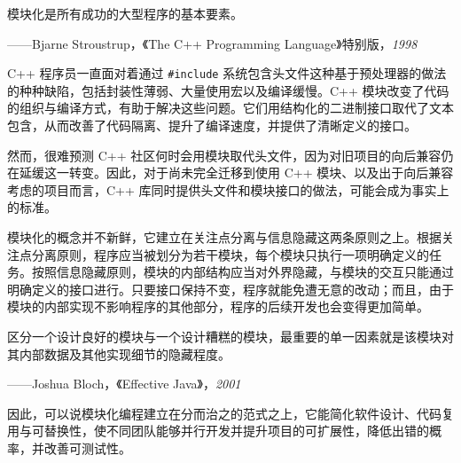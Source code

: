 \begin{myQuote}
模块化是所有成功的大型程序的基本要素。

——Bjarne Stroustrup，《The C++ Programming Language》特别版，\emph{1998}

\end{myQuote}

C++ 程序员一直面对着通过 \texttt{\#include} 系统包含头文件这种基于预处理器的做法的种种缺陷，包括封装性薄弱、大量使用宏以及编译缓慢。C++ 模块改变了代码的组织与编译方式，有助于解决这些问题。它们用结构化的二进制接口取代了文本包含，从而改善了代码隔离、提升了编译速度，并提供了清晰定义的接口。

然而，很难预测 C++ 社区何时会用模块取代头文件，因为对旧项目的向后兼容仍在延缓这一转变。因此，对于尚未完全迁移到使用 C++ 模块、以及出于向后兼容考虑的项目而言，C++ 库同时提供头文件和模块接口的做法，可能会成为事实上的标准。

模块化的概念并不新鲜，它建立在关注点分离与信息隐藏这两条原则之上。根据关注点分离原则，程序应当被划分为若干模块，每个模块只执行一项明确定义的任务。按照信息隐藏原则，模块的内部结构应当对外界隐藏，与模块的交互只能通过明确定义的接口进行。只要接口保持不变，程序就能免遭无意的改动；而且，由于模块的内部实现不影响程序的其他部分，程序的后续开发也会变得更加简单。

\begin{myQuote}
区分一个设计良好的模块与一个设计糟糕的模块，最重要的单一因素就是该模块对其内部数据及其他实现细节的隐藏程度。

——Joshua Bloch，《Effective Java》，\emph{2001}

\end{myQuote}

因此，可以说模块化编程建立在分而治之的范式之上，它能简化软件设计、代码复用与可替换性，使不同团队能够并行开发并提升项目的可扩展性，降低出错的概率，并改善可测试性。


